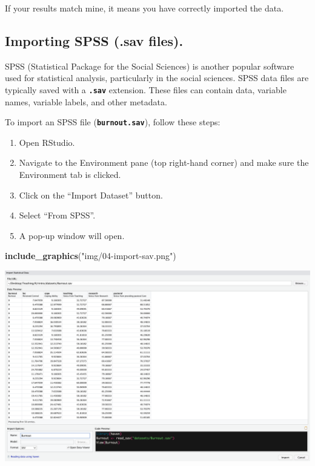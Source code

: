 \documentclass[
]{book}
\newenvironment{Shaded}{\begin{snugshade}}{\end{snugshade}}
\newcommand{\FunctionTok}[1]{\textcolor[rgb]{0.13,0.29,0.53}{\textbf{#1}}}
\newcommand{\NormalTok}[1]{#1}
\newcommand{\StringTok}[1]{\textcolor[rgb]{0.31,0.60,0.02}{#1}}
\begin{document}
If your results match mine, it means you have correctly imported the data.

\hypertarget{importing-spss-.sav-files.}{%
\subsection{Importing SPSS (.sav files).}\label{importing-spss-.sav-files.}}

SPSS (Statistical Package for the Social Sciences) is another popular software used for statistical analysis, particularly in the social sciences. SPSS data files are typically saved with a \textbf{\texttt{.sav}} extension. These files can contain data, variable names, variable labels, and other metadata.

To import an SPSS file (\textbf{\texttt{burnout.sav}}), follow these steps:

\begin{enumerate}
\def\labelenumi{\arabic{enumi}.}
\item
  Open RStudio.
\item
  Navigate to the Environment pane (top right-hand corner) and make sure the Environment tab is clicked.
\item
  Click on the ``Import Dataset'' button.
\item
  Select ``From SPSS''.
\item
  A pop-up window will open.
\end{enumerate}

\begin{Shaded}
\begin{Highlighting}[]
\FunctionTok{include\_graphics}\NormalTok{(}\StringTok{"img/04{-}import{-}sav.png"}\NormalTok{)}
\end{Highlighting}
\end{Shaded}

\includegraphics{img/04-import-sav.png}
\end{document}
